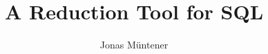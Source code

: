 \documentclass[]{article}
\title{A Reduction Tool for SQL}
\author{Jonas Müntener}
\begin{document}
\maketitle

\begin{abstract}

\end{abstract}





\end{document}
